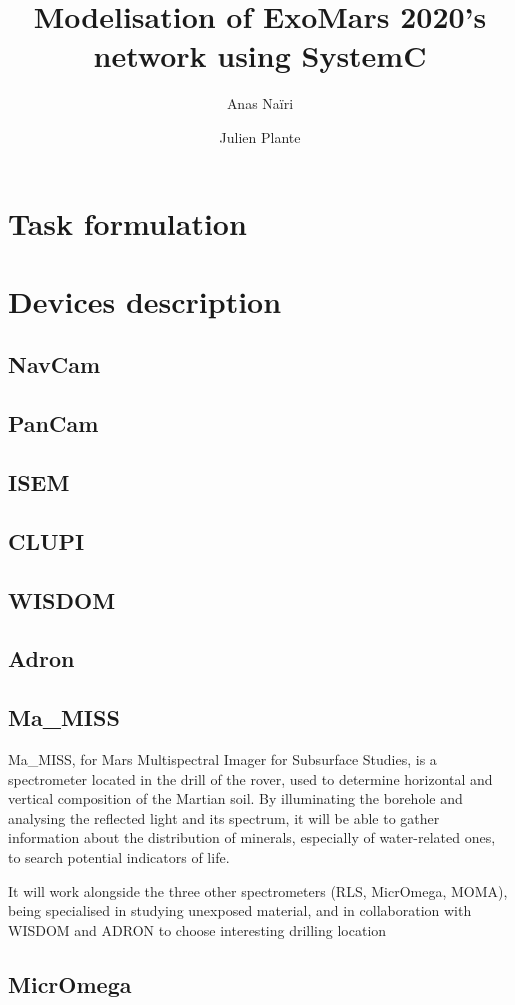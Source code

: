 \documentclass[12pt,a4paper]{article}
\author{Anas Naïri \and Julien Plante}
\title{Modelisation of ExoMars 2020's network using SystemC}
\begin{document}
\maketitle
\section{Task formulation}


\section{Devices description}
\subsection{NavCam}
\subsection{PanCam}
\subsection{ISEM}
\subsection{CLUPI}
\subsection{WISDOM}
\subsection{Adron}
\subsection{Ma\_MISS}
Ma\_MISS, for Mars Multispectral Imager for Subsurface Studies, is a spectrometer located in the drill of the rover, used to determine horizontal and vertical composition of the Martian soil. By illuminating the borehole and analysing the reflected light and its spectrum, it will be able to gather information about the distribution of minerals, especially of water-related ones, to search potential indicators of life.

It will work alongside the three other spectrometers (RLS, MicrOmega, MOMA), being specialised in studying unexposed material, and in collaboration with WISDOM and ADRON to choose interesting drilling location

\subsection{MicrOmega}
\end{document}
